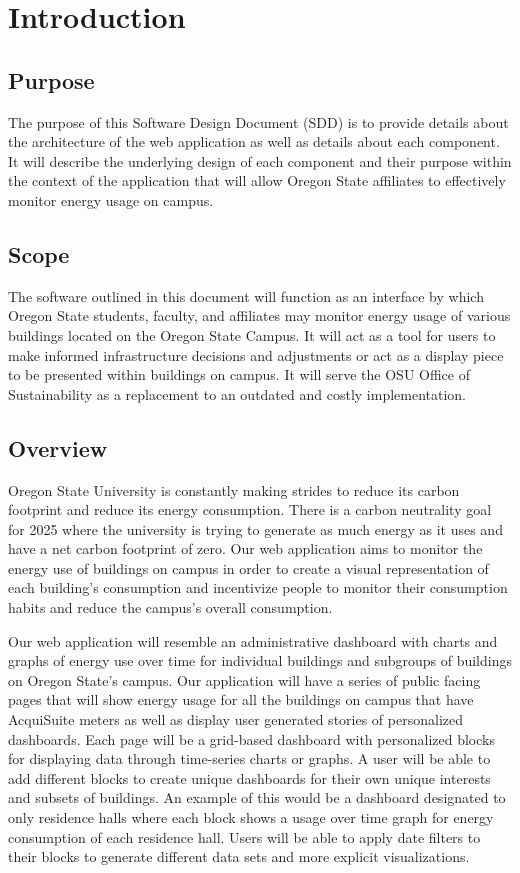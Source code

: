 \documentclass[journal,10pt,onecolumn,compsoc]{IEEEtran}
\begin{document}
    \section{Introduction}
    \subsection{Purpose}
	
    The purpose of this Software Design Document (SDD) is to provide details about the architecture of the web application as well
	as details about each component. It will describe the underlying design of each component and their purpose within the context
	of the application that will allow Oregon State affiliates to effectively monitor energy usage on campus.
	
    \subsection{Scope}
    
	The software outlined in this document will function as an interface by which Oregon State students, faculty, and affiliates
	may monitor energy usage of various buildings located on the Oregon State Campus. It will act as a tool for users to 
	make informed infrastructure decisions and adjustments or act as a display piece to be presented within buildings on campus.
	It will serve the OSU Office of Sustainability as a replacement to an outdated and costly implementation. 
	
    \subsection{Overview}
    Oregon State University is constantly making strides to reduce its carbon footprint and reduce its energy consumption. There is a carbon neutrality goal for 2025 where the university is trying to generate as much energy as it uses and have a net carbon footprint of zero. Our web application aims to monitor the energy use of buildings on campus in order to create a visual representation of each building's consumption and incentivize people to monitor their consumption habits and reduce the campus's overall consumption.

    \noindent Our web application will resemble an administrative dashboard with charts and graphs of energy use over time for individual buildings and subgroups of buildings on Oregon State's campus. 
    Our application will have a series of public facing pages that will show energy usage for all the buildings on campus that have AcquiSuite meters as well as display user generated stories of personalized dashboards. Each page will be a grid-based dashboard with personalized blocks for displaying data through time-series charts or graphs. A user will be able to add different blocks to create unique dashboards for their own unique interests and subsets of buildings. An example of this would be a dashboard designated to only residence halls where each block shows a usage over time graph for energy consumption of each residence hall. Users will be able to apply date filters to their blocks to generate different data sets and more explicit visualizations.
\end{document}
